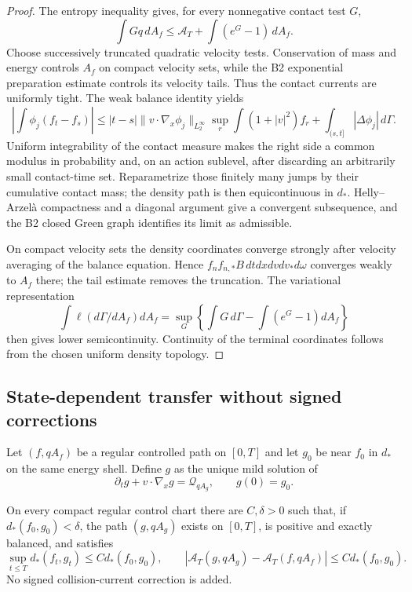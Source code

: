 \begin{proof}
The entropy inequality gives, for every nonnegative contact test $G$,
\[
 \int Gq\,dA_f\le \mathcal A_T+
 \int(e^G-1)\,dA_f.
\]
Choose successively truncated quadratic velocity tests.  Conservation of
mass and energy controls $A_f$ on compact velocity sets, while the B2
exponential preparation estimate controls its velocity tails.  Thus the
contact currents are uniformly tight.  The weak balance identity yields
\[
 \left|\int\phi_j(f_t-f_s)\right|
 \le |t-s|\|v\cdot\nabla_x\phi_j\|_{L^\infty_{2}}
       \sup_r\int(1+|v|^2)f_r
 +\int_{(s,t]}|\Delta\phi_j|\,d\Gamma.
\]
Uniform integrability of the contact measure makes the right side a common
modulus in probability and, on an action sublevel, after discarding an
arbitrarily small contact-time set.  Reparametrize those finitely many jumps
by their cumulative contact mass; the density path is then equicontinuous in
$d_*$.  Helly--Arzel\`a compactness and a diagonal argument give a convergent
subsequence, and the B2 closed Green graph identifies its limit as admissible.

On compact velocity sets the density coordinates converge strongly after
velocity averaging of the balance equation.  Hence
$f_nf_{n,*}B\,dtdxdvdv_*d\omega$ converges weakly to $A_f$ there; the tail
estimate removes the truncation.  The variational representation
\[
 \int\ell(d\Gamma/dA_f)dA_f
 =\sup_G\left\{\int G\,d\Gamma-
                 \int(e^G-1)dA_f\right\}
\]
then gives lower semicontinuity.  Continuity of the terminal coordinates
follows from the chosen uniform density topology.
\end{proof}

\subsection{State-dependent transfer without signed corrections}

Let $(f,qA_f)$ be a regular controlled path on $[0,T]$ and let $g_0$ be near
$f_0$ in $d_*$ on the same energy shell.  Define $g$ as the unique mild
solution of
\[
 \partial_tg+v\cdot\nabla_xg=\mathcal Q_{qA_g},
 \qquad g(0)=g_0.
\]

\begin{lemma}
\label{lem:r21-b4-transfer}
On every compact regular control chart there are $C,\delta>0$ such that, if
$d_*(f_0,g_0)<\delta$, the path $(g,qA_g)$ exists on $[0,T]$, is positive and
exactly balanced, and satisfies
\[
 \sup_{t\le T}d_*(f_t,g_t)\le C d_*(f_0,g_0),
 \qquad
 |\mathcal A_T(g,qA_g)-\mathcal A_T(f,qA_f)|
 \le C d_*(f_0,g_0).
\]
No signed collision-current correction is added.
\end{lemma}

